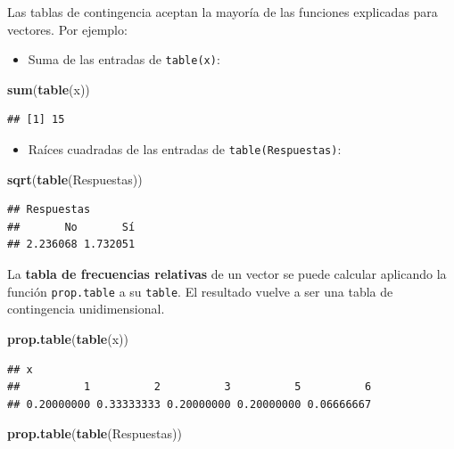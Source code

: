 \documentclass[]{book}
\newenvironment{Shaded}{\begin{snugshade}}{\end{snugshade}}
\newcommand{\KeywordTok}[1]{\textcolor[rgb]{0.13,0.29,0.53}{\textbf{#1}}}
\newcommand{\NormalTok}[1]{#1}
\providecommand{\tightlist}{%
  \setlength{\itemsep}{0pt}\setlength{\parskip}{0pt}}
\theoremstyle{definition}
\theoremstyle{definition}
\theoremstyle{definition}
\theoremstyle{remark}
\begin{document}
Las tablas de contingencia aceptan la mayoría de las funciones explicadas para vectores. Por ejemplo:

\begin{itemize}
\tightlist
\item
  Suma de las entradas de \texttt{table(x)}:
\end{itemize}

\begin{Shaded}
\begin{Highlighting}[]
\KeywordTok{sum}\NormalTok{(}\KeywordTok{table}\NormalTok{(x))}
\end{Highlighting}
\end{Shaded}

\begin{verbatim}
## [1] 15
\end{verbatim}

\begin{itemize}
\tightlist
\item
  Raíces cuadradas de las entradas de \texttt{table(Respuestas)}:
\end{itemize}

\begin{Shaded}
\begin{Highlighting}[]
\KeywordTok{sqrt}\NormalTok{(}\KeywordTok{table}\NormalTok{(Respuestas))}
\end{Highlighting}
\end{Shaded}

\begin{verbatim}
## Respuestas
##       No       Sí 
## 2.236068 1.732051
\end{verbatim}

La \textbf{tabla de frecuencias relativas} de un vector se puede calcular aplicando la función \texttt{prop.table} a su \texttt{table}. El resultado vuelve a ser una tabla de contingencia unidimensional.

\begin{Shaded}
\begin{Highlighting}[]
\KeywordTok{prop.table}\NormalTok{(}\KeywordTok{table}\NormalTok{(x))}
\end{Highlighting}
\end{Shaded}

\begin{verbatim}
## x
##          1          2          3          5          6 
## 0.20000000 0.33333333 0.20000000 0.20000000 0.06666667
\end{verbatim}

\begin{Shaded}
\begin{Highlighting}[]
\KeywordTok{prop.table}\NormalTok{(}\KeywordTok{table}\NormalTok{(Respuestas))}
\end{Highlighting}
\end{Shaded}
\end{document}
